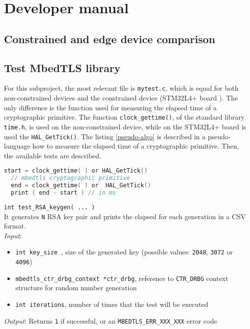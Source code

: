 
\section{Developer manual}
\subsection{Constrained and edge device comparison}
\subsection*{Test MbedTLS library}
For this subproject, the most relevant file is \texttt{mytest.c}, which is equal for both non-constrained devices and the constrained device (STM32L4+ board \cite{stm32-board-product}). The only difference is the function used for measuring the elapsed time of a cryptographic primitive. The function \texttt{clock\_gettime()}, of the standard library \texttt{time.h}, is used on the non-constrained device, while on the STM32L4+ board is used the \texttt{HAL\_GetTick()}. The listing \ref{pseudo-algo} is described in a pseudo-language how to measure the elapsed time of a cryptographic primitive. 
Then, the available tests are described. \\

\begin{lstlisting}[caption={Pseudo algorithm for measuring the elapsed time},captionpos=b,label={pseudo-algo},language=C,frame=single]
  start = clock_gettime( ) or HAL_GetTick()
  // mbedtls cryptographic primitive
  end = clock_gettime( ) or  HAL_GetTick()
  print ( end - start ) // in ms
\end{lstlisting}

\noindent
\texttt{int test\_RSA\_keygen( ... )}\\
It generates \texttt{N} RSA key pair and prints the elapsed for each generation in a CSV format. \\
\textit{Input}:
\begin{itemize}[noitemsep,nolistsep]
  \item \texttt{int key\_size }, size of the generated key (possible values: \texttt{2048}, \texttt{3072} or \texttt{4096})
  \item \texttt{mbedtls\_ctr\_drbg\_context *ctr\_drbg}, reference to \texttt{CTR\_DRBG} context structure for random number generation
  \item \texttt{int iterations}, number of times that the test will be executed
\end{itemize}
\textit{Output}: Returns \texttt{1} if successful, or an \texttt{MBEDTLS\_ERR\_XXX\_XXX} error code


